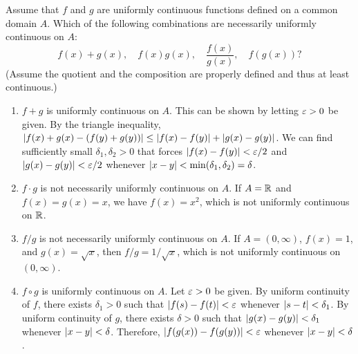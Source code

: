\begin{problem}
  Assume that $f$ and $g$ are uniformly continuous functions defined on a
  common domain $A$. Which of the following combinations are necessarily
  uniformly continuous on $A$:
  \[
    f(x) + g(x), \quad f(x)g(x), \quad \frac{f(x)}{g(x)}, \quad f(g(x)) ?
  \]
  (Assume the quotient and the composition are properly defined and thus at least continuous.)

  \begin{enumerate}[label=(\alph*)]
    \item $f + g$ is uniformly continuous on $A$. This can be shown by letting $\varepsilon > 0$ be given. By the
      triangle inequality, $\left\lvert f(x) + g(x) - (f(y) + g(y))  \right\rvert \leq \left\lvert  f(x) - f(y)  \right\rvert + \left\lvert  g(x) - g(y)  \right\rvert$.
      We can find sufficiently small $\delta_{1}, \delta_{2} > 0$ that forces 
      $\left\lvert  f(x) - f(y)  \right\rvert < \varepsilon/2$ and $\left\lvert  g(x) - g(y)  \right\rvert < \varepsilon/2 $ whenever $\left\lvert  x - y  \right\rvert < \min(\delta_{1}, \delta_{2}) = \delta$.
    \item $f \cdot g$ is not necessarily uniformly continuous on $A$. If $A = \mathbb{R}$ and $f(x) = g(x) = x$, we 
      have $f(x) = x^{2}$, which is not uniformly continuous on $\mathbb{R}$.
    \item $f / g$ is not necessarily uniformly continuous on $A$. If $A = (0, \infty)$, $f(x) = 1$, and $g(x) = \sqrt{x}$, then
      $f/g = 1/\sqrt{x}$, which is not uniformly continuous on $(0, \infty)$.
    \item $f \circ g$ is uniformly continuous on $A$. Let $\varepsilon > 0$ be given. By uniform continuity of $f$,
      there exists $\delta_{1} > 0$ such that $\left\lvert  f(s) - f(t)  \right\rvert < \varepsilon$ whenever $\left\lvert  s - t  \right\rvert < \delta_{1}$.
      By uniform continuity of $g$, there exists $\delta > 0$ such that $\left\lvert  g(x) - g(y)  \right\rvert < \delta_{1}$
      whenever $\left\lvert  x - y  \right\rvert < \delta$. Therefore, $\left\lvert  f(g(x)) - f(g(y))  \right\rvert < \varepsilon$ whenever $\left\lvert  x - y  \right\rvert < \delta$.

  \end{enumerate}
  

\end{problem}

